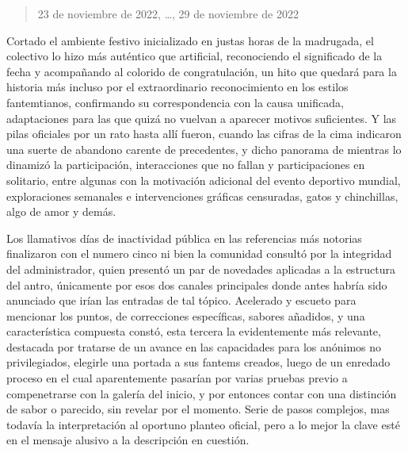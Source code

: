 \documentclass[
]{book}
\begin{document}
\begin{quote}
23 de noviembre de 2022, \ldots, 29 de noviembre de 2022
\end{quote}

Cortado el ambiente festivo inicializado en justas horas de la madrugada, el colectivo lo hizo más auténtico que artificial, reconociendo el significado de la fecha y acompañando al colorido de congratulación, un hito que quedará para la historia más incluso por el extraordinario reconocimiento en los estilos fantemtianos, confirmando su correspondencia con la causa unificada, adaptaciones para las que quizá no vuelvan a aparecer motivos suficientes. Y las pilas oficiales por un rato hasta allí fueron, cuando las cifras de la cima indicaron una suerte de abandono carente de precedentes, y dicho panorama de mientras lo dinamizó la participación, interacciones que no fallan y participaciones en solitario, entre algunas con la motivación adicional del evento deportivo mundial, exploraciones semanales e intervenciones gráficas censuradas, gatos y chinchillas, algo de amor y demás.

Los llamativos días de inactividad pública en las referencias más notorias finalizaron con el numero cinco ni bien la comunidad consultó por la integridad del administrador, quien presentó un par de novedades aplicadas a la estructura del antro, únicamente por esos dos canales principales donde antes habría sido anunciado que irían las entradas de tal tópico. Acelerado y escueto para mencionar los puntos, de correcciones específicas, sabores añadidos, y una característica compuesta constó, esta tercera la evidentemente más relevante, destacada por tratarse de un avance en las capacidades para los anónimos no privilegiados, elegirle una portada a sus fantems creados, luego de un enredado proceso en el cual aparentemente pasarían por varias pruebas previo a compenetrarse con la galería del inicio, y por entonces contar con una distinción de sabor o parecido, sin revelar por el momento. Serie de pasos complejos, mas todavía la interpretación al oportuno planteo oficial, pero a lo mejor la clave esté en el mensaje alusivo a la descripción en cuestión.
\end{document}
